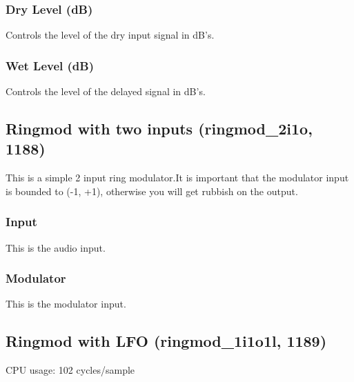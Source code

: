\documentclass[11pt]{article}
\begin{document}
    \subsubsection*{Dry Level (dB)}
Controls the level of the dry input signal in dB's.\subsubsection*{Wet Level (dB)}
Controls the level of the delayed signal in dB's.\subsection{Ringmod with two inputs (ringmod\_2i1o, 1188)\label{ringmod_2i1o}\label{id1188}}
This is a simple 2 input ring modulator.It is important that the modulator input is bounded to (-1, +1), otherwise you will get rubbish on the output.\subsubsection*{Input}
This is the audio input.\subsubsection*{Modulator}
This is the modulator input.\subsection{Ringmod with LFO (ringmod\_1i1o1l, 1189)\label{ringmod_1i1o1l}\label{id1189}}
CPU usage: 102 cycles/sample
\end{document}
